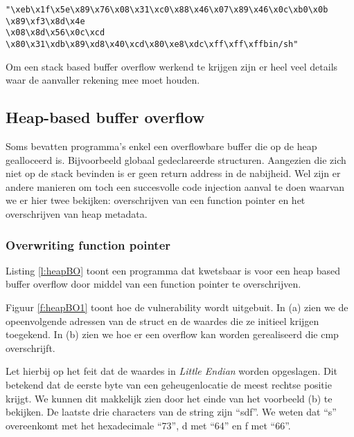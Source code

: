 \documentclass[../main.tex]{subfiles}
\begin{document}
\begin{blockquote}
	\texttt{"\textbackslash xeb\textbackslash x1f\textbackslash x5e\textbackslash x89\textbackslash x76\textbackslash x08\textbackslash x31\textbackslash xc0\textbackslash x88\textbackslash x46\textbackslash x07\textbackslash x89\textbackslash x46\textbackslash x0c\textbackslash xb0\textbackslash x0b \textbackslash x89\textbackslash xf3\textbackslash x8d\textbackslash x4e \\\textbackslash x08\textbackslash x8d\textbackslash x56\textbackslash x0c\textbackslash xcd \textbackslash x80\textbackslash x31\textbackslash xdb\textbackslash x89\textbackslash xd8\textbackslash x40\textbackslash xcd\textbackslash x80\textbackslash xe8\textbackslash xdc\textbackslash xff\textbackslash xff\textbackslash xffbin/sh"}
\end{blockquote}

Om een stack based buffer overflow werkend te krijgen zijn er heel veel details waar de aanvaller rekening mee moet houden.

\subsection{Heap-based buffer overflow}
Soms bevatten programma's enkel een overflowbare buffer die op de heap gealloceerd is.
Bijvoorbeeld globaal gedeclareerde structuren.
Aangezien die zich niet op de stack bevinden is er geen return address in de nabijheid.
Wel zijn er andere manieren om toch een succesvolle code injection aanval te doen waarvan we er hier twee bekijken: overschrijven van een function pointer en het overschrijven van heap metadata.
\subsubsection{Overwriting function pointer}
Listing \ref{l:heapBO} toont een programma dat kwetsbaar is voor een heap based buffer overflow door middel van een function pointer te overschrijven.


Figuur \ref{f:heapBO1} toont hoe de vulnerability wordt uitgebuit.
In (a) zien we de opeenvolgende adressen van de struct en de waardes die ze initieel krijgen toegekend.
In (b) zien we hoe er een overflow kan worden gerealiseerd die cmp overschrijft.

Let hierbij op het feit dat de waardes in \textit{Little Endian} worden opgeslagen.
Dit betekend dat de eerste byte van een geheugenlocatie de meest rechtse positie krijgt.
We kunnen dit makkelijk zien door het einde van het voorbeeld (b) te bekijken. De laatste drie characters van de string zijn ``sdf''.
We weten dat ``s'' overeenkomt met het hexadecimale ``73'', d met ``64'' en f met ``66''.
\end{document}

